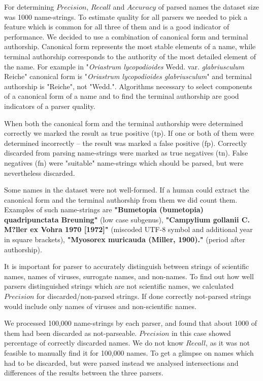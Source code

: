 \documentclass{bmcart}
\begin{document}
For determining $Precision$, $Recall$ and $Accuracy$ of parsed names the
dataset size was 1000 name-strings. To estimate quality for all parsers we
needed to pick a feature which is common for all three of them and is a good
indicator of performance.  We decided to use a combination of canonical form
and terminal authorship.  Canonical form represents the most stable elements
of a name, while terminal authorship corresponds to the authority of the most
detailed element of the name. For example in "\textit{Oriastrum lycopodioides}
Wedd.  var.  \textit{glabriusculum} Reiche" canonical form is
"\textit{Oriastrum lycopodioides glabriusculum}" and terminal authorship is
"Reiche", not "Wedd.".  Algorithms necessary to select components of a
canonical form of a name and to find the terminal authorship are good
indicators of a parser quality.

When both the canonical form and the terminal authorship were determined
correctly we marked the result as true positive ($\text{tp}$).  If one or both
of them were determined incorrectly -- the result was marked a false positive
($\text{fp}$). Correctly discarded from parsing name-strings were marked as
true negatives ($\text{tn}$). False negatives ($\text{fn}$) were "suitable"
name-strings which should be parsed, but were nevertheless discarded.

Some names in the dataset were not well-formed. If a human could extract the
canonical form and the terminal authorship from them we did count them.
Examples of such name-strings are \textbf{"Bumetopia (bumetopia)
quadripunctata Breuning"} (low case subgenus), \textbf{"Campylium gollanii C.
M?ller ex Vohra 1970 [1972]"} (miscoded UTF-8 symbol and additional year in
square brackets), \textbf{"Myosorex muricauda (Miller, 1900)."} (period after
authorship).

It is important for parser to accurately distinguish between strings of
scientific names, names of viruses, surrogate names, and non-names. To find
out how well parsers distinguished strings which are not scientific names, we
calculated $Precision$ for discarded/non-parsed strings. If done correctly
not-parsed strings would include only names of viruses and non-scientific
names.

We processed 100,000 name-strings by each parser, and found that about 1000 of
them had been discarded as not-parseable. $Precision$ in this case showed
percentage of correctly discarded names.  We do not know $Recall$, as it was
not feasible to manually find it for 100,000 names. To get a glimpse on names
which had to be discarded, but were parsed instead we analysed intersections
and differences of the results between the three parsers.
\end{document}
